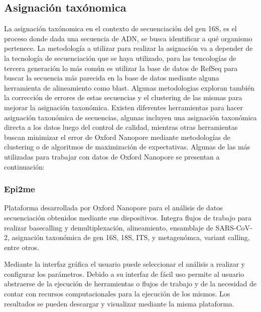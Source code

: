 \subsection{Asignación taxónomica}
La asignación taxónomica en el contexto de secuenciación del gen 16S, es el proceso donde dada una secuencia de ADN, se busca identificar a qué organismo pertenece.
La metodología a utilizar para realizar la asignación va a depender de la tecnología de secuenciación que se haya utilizado,%
para las tencologías de tercera generación lo más común es utilizar la base de datos de RefSeq para buscar la secuencia más parecida en la base de datos mediante alguna herramienta de alineamiento como blast. Algunas metodologias exploran también la corrección de errores de estas secuencias y el clustering de las mismas para mejorar la asignación taxonómica. 
Existen diferentes herramientas para hacer asignación taxonómica de secuencias, algunas incluyen una asignación taxonómica directa a los datos luego del control de calidad, mientras otras herramientas buscan minimizar el error de Oxford Nanopore mediante metodologías de clustering o de algoritmos de maximización de expectativas. 
Algunas de las más utilizadas para trabajar con datos de Oxford Nanopore se presentan a continuación:

\subsubsection{Epi2me}
Plataforma desarrollada por Oxford Nanopore para el análisis de datos secuenciación obtenidos mediante sus dispositivos. 
Integra flujos de trabajo para realizar basecalling y demultiplexación, alineamiento, ensamblaje de SARS-CoV-2, asignación taxonómica de gen 16S, 18S, ITS, y metagenómca, variant calling, entre otros.

Mediante la interfaz gráfica el usuario puede seleccionar el análisis a realizar y configurar los parámetros. Debido a su interfaz de fácil uso permite al usuario abstraerse de la ejecución de herramientas o flujos de trabajo y de la necesidad de contar con recursos computacionales para la ejecución de los mismos.
Los resultados se pueden descargar y visualizar mediante la misma plataforma.


